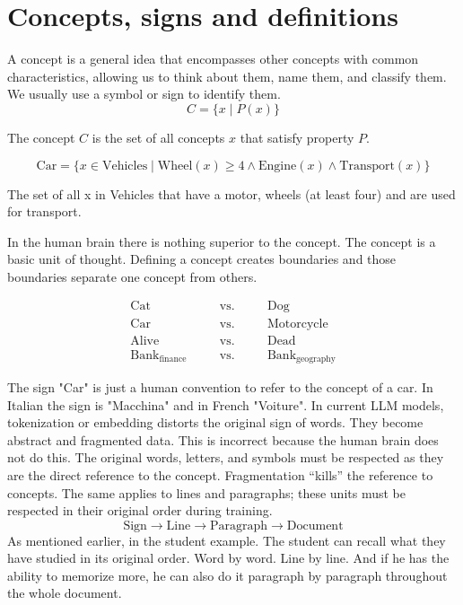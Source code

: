 \documentclass[12pt]{article}
\begin{document}
\section{Concepts, signs and definitions}

A concept is a general idea that encompasses other concepts with common characteristics, allowing us to think about them, name them, and classify them. We usually use a symbol or sign to identify them.
\[
C = \{x \mid P(x)\}
\]

The concept $C$ is the set of all concepts $x$ that satisfy property $P$.

\[
\text{Car} = \{ x \in \text{Vehicles} \mid 
\text{Wheel}(x) \ge 4 \land 
\text{Engine}(x) \land 
\text{Transport}(x)
\}
\]

The set of all x in Vehicles that have a motor, wheels (at least four) and are used for transport.

In the human brain there is nothing superior to the concept. The concept is a basic unit of thought. Defining a concept creates boundaries and those boundaries separate one concept from others. 

\[
\begin{array}{rcccl}
	\text{Cat} & \quad & \text{vs.} & \quad & \text{Dog} \\
	\text{Car} & \quad & \text{vs.} & \quad & \text{Motorcycle} \\
	\text{Alive} & \quad & \text{vs.} & \quad & \text{Dead} \\
	\text{Bank}_{\text{finance}} & \quad & \text{vs.} & \quad & \text{Bank}_{\text{geography}}
\end{array}
\]

The sign "Car" is just a human convention to refer to the concept of a car. In Italian the sign is "Macchina" and in French "Voiture".
In current LLM models, tokenization or embedding distorts the original sign of words.
They become abstract and fragmented data. This is incorrect because the human brain does not do this.
The original words, letters, and symbols must be respected as they are the direct reference to the concept.
Fragmentation “kills” the reference to concepts.
The same applies to lines and paragraphs; these units must be respected in their original order during training.
\[
\text{Sign} \xrightarrow{} \text{Line} \xrightarrow{} \text{Paragraph} \xrightarrow{} \text{Document}
\]
As mentioned earlier, in the student example. The student can recall what they have studied in its original order. Word by word. Line by line. And if he has the ability to memorize more, he can also do it paragraph by paragraph throughout the whole document.
\end{document}
